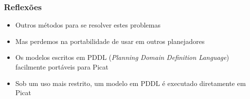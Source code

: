 \begin{frame}[fragile]
\frametitle{Reflexões}


\begin{itemize}
  \item Outros métodos para se resolver estes problemas
  \pause
  \item Mas perdemos na portabilidade de usar em outros planejadores
  \pause
  \item Os modelos escritos em PDDL (\textit{Planning Domain Definition Language})
  facilmente portáveis para Picat
    \pause
  \item Sob um uso mais restrito, um modelo em PDDL é executado diretamente em Picat
\end{itemize}

\end{frame}




